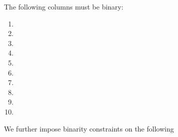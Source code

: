 The following columns must be binary:
\begin{multicols}{2}
    \begin{enumerate}
        \item \isBlsGOneAddData             
        \item \isBlsGOneAddResult           
        \item \isBlsGTwoAddData             
        \item \isBlsGTwoAddResult           
        \item \isBlsGOneMsmData             
        \item \isBlsGOneMsmResult           
        \item \isBlsMapFpToGOneData         
        \item \isBlsMapFpToGOneResult       
        \item \isBlsMapFpToGTwoData         
        \item \isBlsMapFpTwoToGTwoResult     
    \end{enumerate}
\end{multicols}
\noindent We further impose binarity constraints on the following
